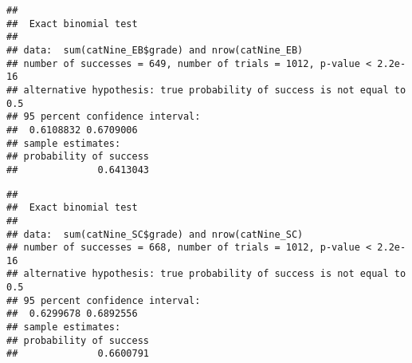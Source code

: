 \documentclass[
]{article}
\newenvironment{Shaded}{\begin{snugshade}}{\end{snugshade}}
\newcommand{\AttributeTok}[1]{\textcolor[rgb]{0.77,0.63,0.00}{#1}}
\newcommand{\DecValTok}[1]{\textcolor[rgb]{0.00,0.00,0.81}{#1}}
\newcommand{\FunctionTok}[1]{\textcolor[rgb]{0.00,0.00,0.00}{#1}}
\newcommand{\NormalTok}[1]{#1}
\newcommand{\OtherTok}[1]{\textcolor[rgb]{0.56,0.35,0.01}{#1}}
\newcommand{\SpecialCharTok}[1]{\textcolor[rgb]{0.00,0.00,0.00}{#1}}
\newcommand{\StringTok}[1]{\textcolor[rgb]{0.31,0.60,0.02}{#1}}
\begin{document}
\begin{verbatim}
## 
##  Exact binomial test
## 
## data:  sum(catNine_EB$grade) and nrow(catNine_EB)
## number of successes = 649, number of trials = 1012, p-value < 2.2e-16
## alternative hypothesis: true probability of success is not equal to 0.5
## 95 percent confidence interval:
##  0.6108832 0.6709006
## sample estimates:
## probability of success 
##              0.6413043
\end{verbatim}

\begin{Shaded}
\end{Shaded}

\begin{verbatim}
## 
##  Exact binomial test
## 
## data:  sum(catNine_SC$grade) and nrow(catNine_SC)
## number of successes = 668, number of trials = 1012, p-value < 2.2e-16
## alternative hypothesis: true probability of success is not equal to 0.5
## 95 percent confidence interval:
##  0.6299678 0.6892556
## sample estimates:
## probability of success 
##              0.6600791
\end{verbatim}
\end{document}
